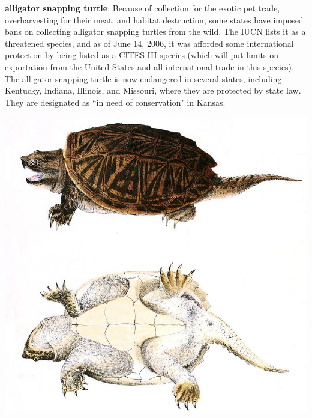 \begin{center}
\begin{longtabu}
	\textbf{alligator snapping turtle}: Because of collection for the exotic pet trade, overharvesting for their meat, and habitat destruction, some states have imposed bans on collecting alligator snapping turtles from the wild. The IUCN lists it as a threatened species, and as of June 14, 2006, it was afforded some international protection by being listed as a CITES III species (which will put limits on exportation from the United States and all international trade in this species). The alligator snapping turtle is now endangered in several states, including Kentucky, Indiana, Illinois, and Missouri, where they are protected by state law. They are designated as ``in need of conservation" in Kansas.
	\\
	\hline
\end{longtabu}
\includegraphics[scale=0.25]{testudines/chelydridae/common}

\end{center}
